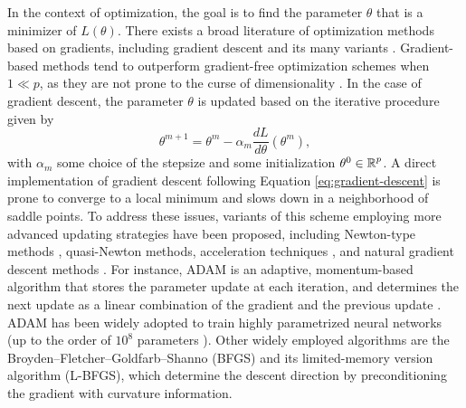 In the context of optimization, the goal is to find the parameter $\theta$ that is a minimizer of $L(\theta)$. 
There exists a broad literature of optimization methods based on gradients, including gradient descent and its many variants \cite{ruder2016overview-gradient-descent}.
Gradient-based methods tend to outperform gradient-free optimization schemes when $1 \ll p$, as they are not prone to the curse of dimensionality \cite{Schartau2017}. 
In the case of gradient descent, the parameter $\theta$ is updated based on the iterative procedure given by
\begin{equation}\label{eq:gradient-descent}
    \theta^{m+1} 
    = 
    \theta^m 
    - 
    \alpha_m 
    \frac{dL}{d\theta}(\theta^m),
\end{equation}
with $\alpha_m$ some choice of the stepsize and some initialization $\theta^0 \in \operatorname{\mathbb{R}}^p$. 
A direct implementation of gradient descent following Equation \eqref{eq:gradient-descent} is prone to converge to a local minimum and slows down in a neighborhood of saddle points. 
To address these issues, variants of this scheme employing more advanced updating strategies have been proposed, including Newton-type methods \cite{second-order-optimization}, quasi-Newton methods, acceleration techniques \cite{JMLR:v22:20-207}, and natural gradient descent methods \cite{doi:10.1137/22M1477805}. 
For instance, ADAM is an adaptive, momentum-based algorithm  that stores the parameter update at each iteration, and determines the next update as a linear combination of the gradient and the previous update \cite{Kingma2014}.
ADAM has been widely adopted to train highly parametrized neural networks (up to the order of $10^8$ parameters \cite{NIPS2017_3f5ee243}).
Other widely employed algorithms are the Broyden–Fletcher–Goldfarb–Shanno (BFGS) and its limited-memory version algorithm (L-BFGS), which determine the descent direction by preconditioning the gradient with curvature information. 

